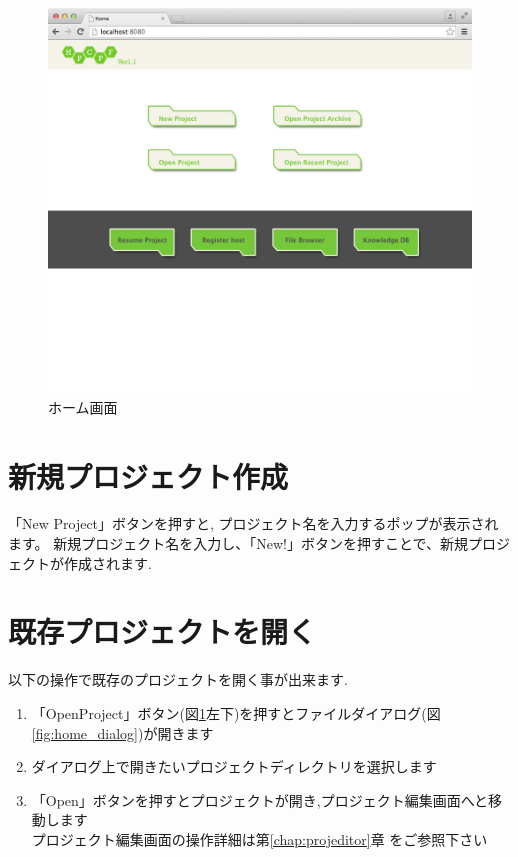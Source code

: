 \documentclass[a4paper,10pt,oneside]{jsbook}
\begin{document}
\begin{figure}[H]
	\begin{center}
		\includegraphics[width=11.5cm]{image/home_000.png}
	\end{center}
	\caption{ホーム画面}
	\label{fig:home}
\end{figure}


\section{新規プロジェクト作成}
「New Project」ボタンを押すと, プロジェクト名を入力するポップが表示されます。
新規プロジェクト名を入力し、「New!」ボタンを押すことで、新規プロジェクトが作成されます.


\section{既存プロジェクトを開く}
以下の操作で既存のプロジェクトを開く事が出来ます.
\begin{enumerate}
	\item 「OpenProject」ボタン(図\ref{fig:home}左下)を押すとファイルダイアログ(図\ref{fig:home_dialog})が開きます
	\item ダイアログ上で開きたいプロジェクトディレクトリを選択します
	\item 「Open」ボタンを押すとプロジェクトが開き,プロジェクト編集画面へと移動します\\
			プロジェクト編集画面の操作詳細は第\ref{chap:projeditor}章 をご参照下さい
\end{enumerate}
\end{document}
